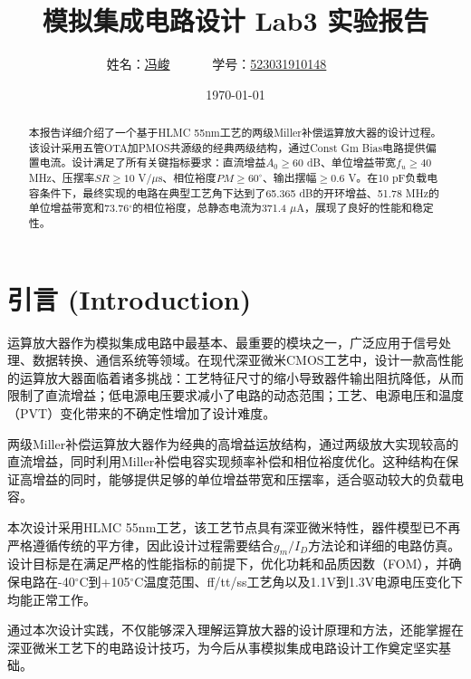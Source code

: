\documentclass[UTF8,12pt,a4paper]{ctexart}
\title{模拟集成电路设计 Lab3 实验报告}
\author{
	姓名：\underline{冯峻}~~~~~~
	学号：\underline{523031910148}~~~~~~}
\date{\today}
\begin{document}
\fancyfoot[C]{\thepage}

\maketitle
\tableofcontents
\newpage

\begin{abstract}
本报告详细介绍了一个基于HLMC 55nm工艺的两级Miller补偿运算放大器的设计过程。该设计采用五管OTA加PMOS共源级的经典两级结构，通过Const Gm Bias电路提供偏置电流。设计满足了所有关键指标要求：直流增益$A_0 \geq 60$ dB、单位增益带宽$f_u \geq 40$ MHz、压摆率$SR \geq 10$ V/$\mu$s、相位裕度$PM \geq 60^\circ$、输出摆幅$\geq 0.6$ V。在10 pF负载电容条件下，最终实现的电路在典型工艺角下达到了65.365 dB的开环增益、51.78 MHz的单位增益带宽和73.76$^\circ$的相位裕度，总静态电流为371.4 $\mu$A，展现了良好的性能和稳定性。
\end{abstract}

\newpage

\section{引言 (Introduction)}

运算放大器作为模拟集成电路中最基本、最重要的模块之一，广泛应用于信号处理、数据转换、通信系统等领域。在现代深亚微米CMOS工艺中，设计一款高性能的运算放大器面临着诸多挑战：工艺特征尺寸的缩小导致器件输出阻抗降低，从而限制了直流增益；低电源电压要求减小了电路的动态范围；工艺、电源电压和温度（PVT）变化带来的不确定性增加了设计难度。

两级Miller补偿运算放大器作为经典的高增益运放结构，通过两级放大实现较高的直流增益，同时利用Miller补偿电容实现频率补偿和相位裕度优化。这种结构在保证高增益的同时，能够提供足够的单位增益带宽和压摆率，适合驱动较大的负载电容。

本次设计采用HLMC 55nm工艺，该工艺节点具有深亚微米特性，器件模型已不再严格遵循传统的平方律，因此设计过程需要结合$g_m/I_D$方法论和详细的电路仿真。设计目标是在满足严格的性能指标的前提下，优化功耗和品质因数（FOM），并确保电路在-40$^\circ$C到+105$^\circ$C温度范围、ff/tt/ss工艺角以及1.1V到1.3V电源电压变化下均能正常工作。

通过本次设计实践，不仅能够深入理解运算放大器的设计原理和方法，还能掌握在深亚微米工艺下的电路设计技巧，为今后从事模拟集成电路设计工作奠定坚实基础。
\end{document}
